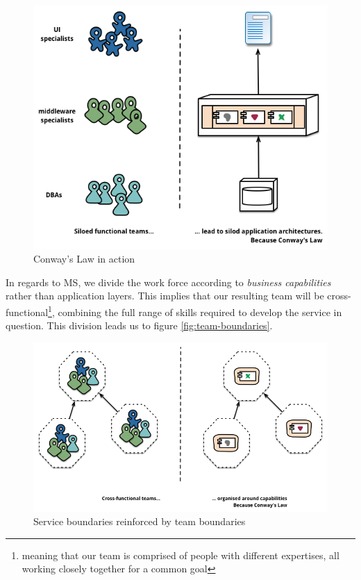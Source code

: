 \begin{figure}
	\centering
	\includegraphics[width=\linewidth]{images/conways-law.png}
	\caption{Conway's Law in action}
	\label{fig:conway}
\end{figure}

In regards to MS, we divide the work force according to
\textit{business capabilities} rather than application layers. This
implies that our resulting team will be
cross-functional\footnote{meaning that our team is comprised of people
with different expertises, all working closely together for a common
goal}, combining the full range of skills required to develop the
service in question. This division leads us to figure
\vref{fig:team-boundaries}.

\begin{figure}
	\centering
	\includegraphics[width=\linewidth]{images/PreferFunctionalStaffOrganization.png}
	\caption{Service boundaries reinforced by team boundaries}
	\label{fig:team-boundaries}
\end{figure}

